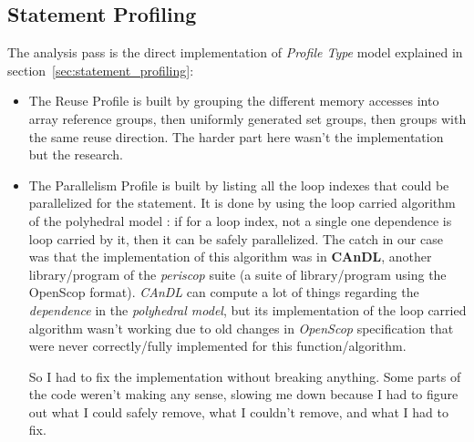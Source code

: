 \documentclass[paper=a4, fontsize=11.5pt]{scrartcl}
\numberwithin{equation}{section}        %
\numberwithin{figure}{section}          %
\numberwithin{table}{section}               %
\begin{document}
    \subsection{Statement Profiling}
    The analysis pass is the direct implementation of \textit{Profile Type} model explained in section~\ref{sec:statement_profiling}:
    \begin{itemize}
        \item The Reuse Profile is built by grouping the
            different memory accesses into array reference groups, then uniformly generated set groups,
            then groups with the same reuse direction. The harder part here wasn't the
            implementation but the research.

        \item The Parallelism Profile is built by listing all the loop indexes that could be
            parallelized for the statement. It is done by using the loop carried algorithm
            of the polyhedral model : if for a loop index, not a single one dependence is
            loop carried by it, then it can be safely parallelized.
            The catch in our case was that the implementation of this algorithm was in
            \textbf{CAnDL}, another library/program of the \textit{periscop} suite (a suite of
            library/program using the OpenScop format). \textit{CAnDL} can compute
            a lot of things regarding the \textit{dependence} in the \textit{polyhedral model},
            but its implementation of the loop carried algorithm wasn't working due to old
            changes in \textit{OpenScop} specification that were never correctly/fully implemented
            for this function/algorithm.
            
            
            So I had to fix the implementation without breaking anything.
            Some parts of the code weren't making any sense, slowing me down because I had
            to figure out what I could safely remove, what I couldn't remove, and what I
            had to fix.


\end{itemize}
\end{document}
